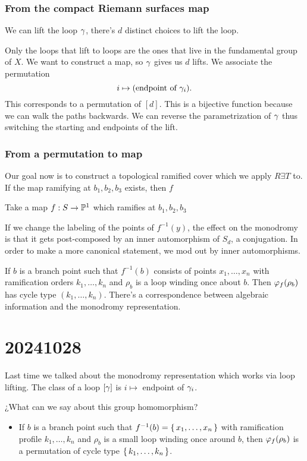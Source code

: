 \documentclass[12pt]{memoir}
\begin{document}
\subsubsection{From the compact Riemann surfaces map}

We can lift the loop $\gamma$, there's $d$ distinct choices to lift the loop.

Only the loops that lift to loops are the ones that live in the fundamental group of $X$. We want to construct a map, so $\gamma$ gives us $d$ lifts. We associate the permutation 
$$i\mapsto (\text{endpoint of }\gamma_i).$$
This corresponds to a permutation of $[d]$. This is a bijective function because we can walk the paths backwards. We can reverse the parametrization of $\gamma$ thus switching the starting and endpoints of the lift.

\subsubsection{From a permutation to map}

Our goal now is to construct a topological ramified cover which we apply $R\exists T$ to. If the map ramifying at $b_1,b_2,b_3$ exists, then $f$

\begin{Ej}
    Take a map $f:S\to\mathbb{P}^1$ which ramifies at $b_1,b_2,b_3$
\end{Ej}

\begin{Rmk}
    If we change the labeling of the points of $f^{-1}(y)$, the effect on the monodromy is that it gets post-composed by an inner automorphism of $S_d$, a conjugation. In order to make a more canonical statement, we mod out by inner automorphisms.\par
    If $b$ is a branch point such that $f^{-1}(b)$ consists of points $x_1,\dots,x_n$ with ramification orders $k_1,\dots,k_n$ and $\rho_b$ is a loop winding once about $b$. Then 
    $\varphi_f(\rho_b)$ has cycle type $(k_1,\dots,k_n)$. There's a correspondence between algebraic information and the monodromy representation.
\end{Rmk}

\section{20241028}

Last time we talked about the monodromy representation which works via loop lifting. The class of a loop $[\gamma]$ is $i\mapsto$ endpoint of $\gamma_i$.\par
¿What can we say about this group homomorphism?
\begin{itemize}
    \item If $b$ is a branch point such that $f^{-1}(b)=\{\,x_1,\dots,x_n\,\}$ with ramification profile $k_1,\dots,k_n$ and $\rho_b$ is a small loop winding once around $b$, then $\varphi_f(\rho_b)$ is a permutation of cycle type $\{\,k_1,\dots,k_n\,\}$. 
\end{itemize}
\end{document}
